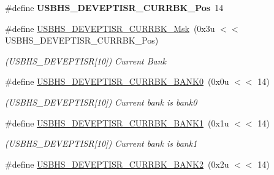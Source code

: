 \begin{DoxyCompactItemize}
\mbox{\label{group__SAMS70__USBHS_gaf1040327b8d8ee4bfc63394aa1f9b0d7}} 
\#define {\bfseries U\+S\+B\+H\+S\+\_\+\+D\+E\+V\+E\+P\+T\+I\+S\+R\+\_\+\+C\+U\+R\+R\+B\+K\+\_\+\+Pos}~14
\item 
\mbox{\label{group__SAMS70__USBHS_ga7c73d2b3727580bd7efba8f42386146a}} 
\#define \mbox{\hyperlink{group__SAMS70__USBHS_ga7c73d2b3727580bd7efba8f42386146a}{U\+S\+B\+H\+S\+\_\+\+D\+E\+V\+E\+P\+T\+I\+S\+R\+\_\+\+C\+U\+R\+R\+B\+K\+\_\+\+Msk}}~(0x3u $<$$<$ U\+S\+B\+H\+S\+\_\+\+D\+E\+V\+E\+P\+T\+I\+S\+R\+\_\+\+C\+U\+R\+R\+B\+K\+\_\+\+Pos)
\begin{DoxyCompactList}\small\item\em (U\+S\+B\+H\+S\+\_\+\+D\+E\+V\+E\+P\+T\+I\+SR\mbox{[}10\mbox{]}) Current Bank \end{DoxyCompactList}\item 
\mbox{\label{group__SAMS70__USBHS_ga69452e2ef35a964e9d9565a530992986}} 
\#define \mbox{\hyperlink{group__SAMS70__USBHS_ga69452e2ef35a964e9d9565a530992986}{U\+S\+B\+H\+S\+\_\+\+D\+E\+V\+E\+P\+T\+I\+S\+R\+\_\+\+C\+U\+R\+R\+B\+K\+\_\+\+B\+A\+N\+K0}}~(0x0u $<$$<$ 14)
\begin{DoxyCompactList}\small\item\em (U\+S\+B\+H\+S\+\_\+\+D\+E\+V\+E\+P\+T\+I\+SR\mbox{[}10\mbox{]}) Current bank is bank0 \end{DoxyCompactList}\item 
\mbox{\label{group__SAMS70__USBHS_ga8469b25586b51f7157353843faee46a5}} 
\#define \mbox{\hyperlink{group__SAMS70__USBHS_ga8469b25586b51f7157353843faee46a5}{U\+S\+B\+H\+S\+\_\+\+D\+E\+V\+E\+P\+T\+I\+S\+R\+\_\+\+C\+U\+R\+R\+B\+K\+\_\+\+B\+A\+N\+K1}}~(0x1u $<$$<$ 14)
\begin{DoxyCompactList}\small\item\em (U\+S\+B\+H\+S\+\_\+\+D\+E\+V\+E\+P\+T\+I\+SR\mbox{[}10\mbox{]}) Current bank is bank1 \end{DoxyCompactList}\item 
\mbox{\label{group__SAMS70__USBHS_gac4b7b4890cb24cf67ab983ea62bb76bd}} 
\#define \mbox{\hyperlink{group__SAMS70__USBHS_gac4b7b4890cb24cf67ab983ea62bb76bd}{U\+S\+B\+H\+S\+\_\+\+D\+E\+V\+E\+P\+T\+I\+S\+R\+\_\+\+C\+U\+R\+R\+B\+K\+\_\+\+B\+A\+N\+K2}}~(0x2u $<$$<$ 14)

\end{DoxyCompactItemize}
